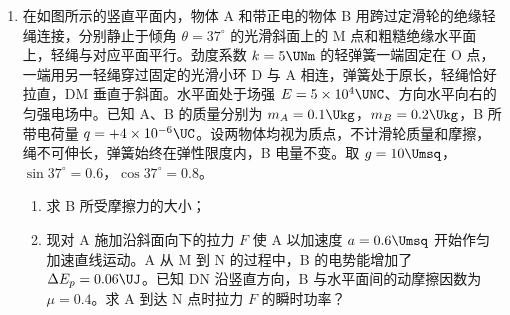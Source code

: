 \documentclass[\gkver]{gaokaozhenti}
\begin{document}
\begin{enumerate}
{\begin{enumerate}
	\item
	$2\Us$

\end{enumerate}
}

\item
在如图所示的竖直平面内，物体 A 和带正电的物体 B 用跨过定滑轮的绝缘轻绳连接，分别静止于倾角 $\theta=37^{\circ}$ 的光滑斜面上的 M 点和粗糙绝缘水平面上，轻绳与对应平面平行。劲度系数 $k=5\UNm$ 的轻弹簧一端固定在 O 点，一端用另一轻绳穿过固定的光滑小环 D 与 A 相连，弹簧处于原长，轻绳恰好拉直，DM 垂直于斜面。水平面处于场强 $E=5\times10^{4}\UNC$、方向水平向右的匀强电场中。已知 A、B 的质量分别为 $m_{A}=0.1\Ukg$，$m_{B}=0.2\Ukg$，B 所带电荷量 $q=+4\times10^{-6}\UC$。设两物体均视为质点，不计滑轮质量和摩擦，绳不可伸长，弹簧始终在弹性限度内，B 电量不变。取 $g=10\Umsq$，$\sin37^{\circ}=0.6$，$\cos37^{\circ}=0.8$。
\begin{enumerate}
	\item
	求 B 所受摩擦力的大小；
	\item
	现对 A 施加沿斜面向下的拉力 $F$ 使 A 以加速度 $a=0.6\Umsq$ 开始作匀加速直线运动。A 从 M 到 N 的过程中，B 的电势能增加了 $\Delta E_{p}=0.06\UJ$。已知 DN 沿竖直方向，B 与水平面间的动摩擦因数为 $\mu=0.4$。求 A 到达 N 点时拉力 $F$ 的瞬时功率？
\end{enumerate}


\jdanswer{
\begin{enumerate}
	\item
	$0.4\UN$

	\item
	$0.528\UW$

\end{enumerate}
}
\end{enumerate}
\end{document}
